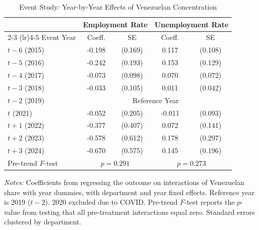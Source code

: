 \begin{table}[htbp]
\centering
\caption{Event Study: Year-by-Year Effects of Venezuelan Concentration}
\label{tab:eventstudy}
\begin{threeparttable}
\begin{tabular}{lcccc}
\hline\hline
& \multicolumn{2}{c}{Employment Rate} & \multicolumn{2}{c}{Unemployment Rate} \\
\cmidrule(lr){2-3} \cmidrule(lr){4-5}
Event Year & Coeff. & SE & Coeff. & SE \\
\hline
$t-6$ (2015) & -0.198 & (0.169) & 0.117 & (0.108) \\
$t-5$ (2016) & -0.242 & (0.193) & 0.153 & (0.129) \\
$t-4$ (2017) & -0.073 & (0.098) & 0.070 & (0.072) \\
$t-3$ (2018) & -0.033 & (0.105) & 0.011 & (0.042) \\
$t-2$ (2019) & \multicolumn{4}{c}{Reference Year} \\
$t$ (2021) & -0.052 & (0.205) & -0.011 & (0.093) \\
$t+1$ (2022) & -0.377 & (0.407) & 0.072 & (0.141) \\
$t+2$ (2023) & -0.578 & (0.612) & 0.178 & (0.297) \\
$t+3$ (2024) & -0.670 & (0.575) & 0.145 & (0.196) \\
\hline
Pre-trend $F$-test & \multicolumn{2}{c}{$p = 0.291$} & \multicolumn{2}{c}{$p = 0.273$} \\
\hline\hline
\end{tabular}
\begin{tablenotes}[flushleft]
\small
\item \textit{Notes:} Coefficients from regressing the outcome on interactions of Venezuelan share with year dummies, with department and year fixed effects. Reference year is 2019 ($t-2$). 2020 excluded due to COVID. Pre-trend $F$-test reports the $p$-value from testing that all pre-treatment interactions equal zero. Standard errors clustered by department.
\end{tablenotes}
\end{threeparttable}
\end{table}
